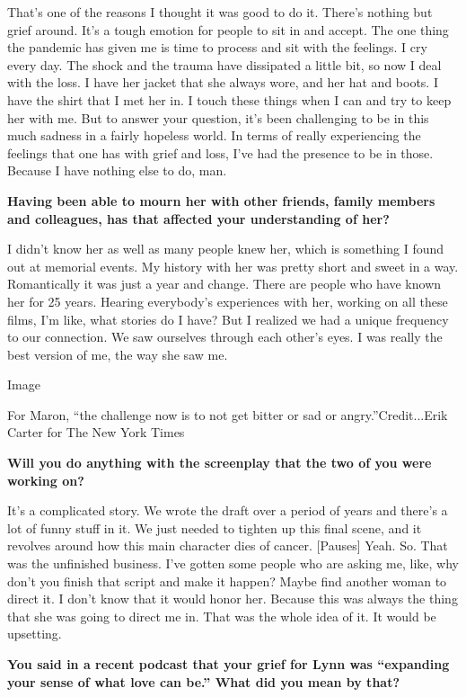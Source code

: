 That's one of the reasons I thought it was good to do it. There's
nothing but grief around. It's a tough emotion for people to sit in and
accept. The one thing the pandemic has given me is time to process and
sit with the feelings. I cry every day. The shock and the trauma have
dissipated a little bit, so now I deal with the loss. I have her jacket
that she always wore, and her hat and boots. I have the shirt that I met
her in. I touch these things when I can and try to keep her with me. But
to answer your question, it's been challenging to be in this much
sadness in a fairly hopeless world. In terms of really experiencing the
feelings that one has with grief and loss, I've had the presence to be
in those. Because I have nothing else to do, man.

\textbf{Having been able to mourn her with other friends, family members
and colleagues, has that affected your understanding of her?}

I didn't know her as well as many people knew her, which is something I
found out at memorial events. My history with her was pretty short and
sweet in a way. Romantically it was just a year and change. There are
people who have known her for 25 years. Hearing everybody's experiences
with her, working on all these films, I'm like, what stories do I have?
But I realized we had a unique frequency to our connection. We saw
ourselves through each other's eyes. I was really the best version of
me, the way she saw me.

Image

For Maron, ``the challenge now is to not get bitter or sad or
angry.''Credit...Erik Carter for The New York Times

\textbf{Will you do anything with the screenplay that the two of you
were working on?}

It's a complicated story. We wrote the draft over a period of years and
there's a lot of funny stuff in it. We just needed to tighten up this
final scene, and it revolves around how this main character dies of
cancer. {[}Pauses{]} Yeah. So. That was the unfinished business. I've
gotten some people who are asking me, like, why don't you finish that
script and make it happen? Maybe find another woman to direct it. I
don't know that it would honor her. Because this was always the thing
that she was going to direct me in. That was the whole idea of it. It
would be upsetting.

\textbf{You said in a recent podcast that your grief for Lynn was
``expanding your sense of what love can be.'' What did you mean by
that?}

